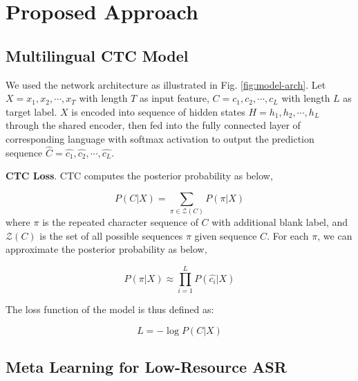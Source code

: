 \section{Proposed Approach}
\label{sec:approach}

\subsection{Multilingual CTC Model}

We used the network architecture as illustrated in Fig. \ref{fig:model-arch}. Let $X = x_1, x_2, \cdots, x_T$ with length $T$ as input feature, $C = c_1, c_2, \cdots, c_L$ with length $L$ as target label. $X$ is encoded into sequence of hidden states $H = h_1, h_2, \cdots, h_L$ through the shared encoder, then fed into the fully connected layer of corresponding language with softmax activation to output the prediction sequence $\hat{C} = \hat{c_1}, \hat{c_2}, \cdots, \hat{c_L}$.

\textbf{CTC Loss}. CTC computes the posterior probability as below,

\begin{equation}
  P(C|X) = \sum_{\pi \in \mathcal{Z}(C)} P(\pi|X)
\end{equation}
where $\pi$ is the repeated character sequence  of $C$ with additional blank label, and $\mathcal{Z}(C)$ is the set of all possible sequences $\pi$ given sequence $C$. For each $\pi$, we can approximate the posterior probability as below,

\begin{equation}
  P(\pi|X) \approx \prod_{i=1}^{L} P(\hat{c_i}|X)
\end{equation}

The loss function of the model is thus defined as:

\begin{equation}
  L = - \log P(C|X)
\end{equation}

\subsection{Meta Learning for Low-Resource ASR}

%
%
%

